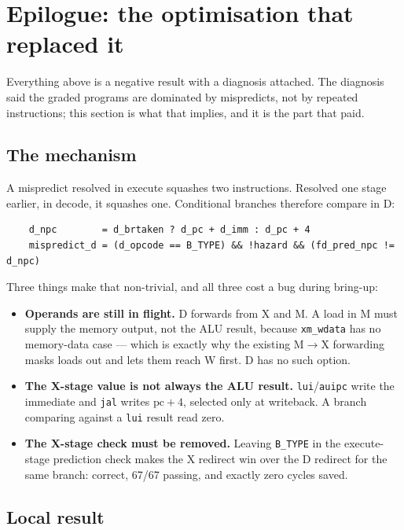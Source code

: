 \documentclass[11pt]{article}
\begin{document}
\section{Epilogue: the optimisation that replaced it}

Everything above is a negative result with a diagnosis attached. The diagnosis said the
graded programs are dominated by mispredicts, not by repeated instructions; this section is
what that implies, and it is the part that paid.

\subsection{The mechanism}

A mispredict resolved in execute squashes two instructions. Resolved one stage earlier, in
decode, it squashes one. Conditional branches therefore compare in D:

\begin{verbatim}
    d_npc        = d_brtaken ? d_pc + d_imm : d_pc + 4
    mispredict_d = (d_opcode == B_TYPE) && !hazard && (fd_pred_npc != d_npc)
\end{verbatim}
Three things make that non-trivial, and all three cost a bug during bring-up:

\begin{itemize}
\item \textbf{Operands are still in flight.} D forwards from X and M. A load in M must supply
the memory output, not the ALU result, because \texttt{xm\_wdata} has no memory-data case ---
which is exactly why the existing M$\rightarrow$X forwarding masks loads out and lets them
reach W first. D has no such option.
\item \textbf{The X-stage value is not always the ALU result.} \texttt{lui}/\texttt{auipc}
write the immediate and \texttt{jal} writes $\mathrm{pc}+4$, selected only at writeback. A
branch comparing against a \texttt{lui} result read zero.
\item \textbf{The X-stage check must be removed.} Leaving \texttt{B\_TYPE} in the execute-stage
prediction check makes the X redirect win over the D redirect for the same branch: correct,
67/67 passing, and exactly zero cycles saved.
\end{itemize}

\subsection{Local result}
\end{document}
